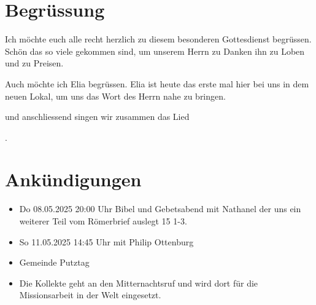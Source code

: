 \documentclass{../../inc/mybib}
\begin{document}
\section{Begrüssung}

Ich möchte euch alle recht herzlich zu diesem besonderen Gottesdienst begrüssen. Schön das so viele gekommen sind, um unserem Herrn zu Danken ihn zu Loben und zu Preisen.

Auch möchte ich Elia begrüssen. Elia ist heute das erste mal hier bei uns in dem neuen Lokal, um uns das Wort des Herrn nahe zu bringen.

\noindent
\beten{} und anschliessend singen wir zusammen das Lied

\noindent
{}.

\section{Ankündigungen}
\begin{itemize}
    \item {} Do 08.05.2025 20:00 Uhr Bibel und Gebetsabend mit Nathanel der uns ein weiterer Teil vom Römerbrief auslegt 15 1-3.
    \item {} So 11.05.2025 14:45 Uhr mit Philip Ottenburg
    \item {} Gemeinde Putztag  
    \item {} Die Kollekte geht an den Mitternachtsruf und wird dort für die Missionsarbeit in der Welt eingesetzt.
\end{itemize}
\end{document}
